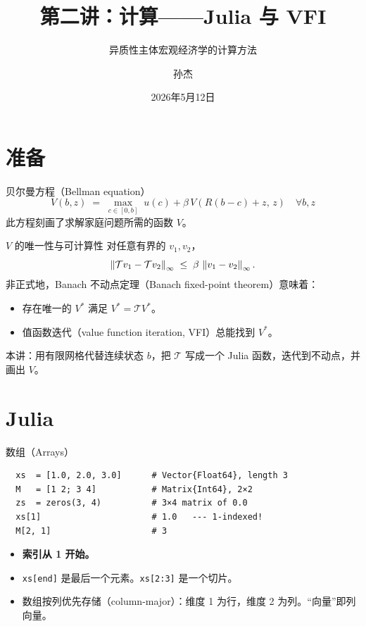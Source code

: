 \documentclass[10pt,aspectratio=169]{beamer}
\title{第二讲：计算——Julia 与 VFI}
\subtitle{异质性主体宏观经济学的计算方法}
\author{孙杰}
\institute{多伦多大学}
\date{2026年5月12日}
\begin{document}
\maketitle

\section{准备}

\begin{frame}{贝尔曼方程（Bellman equation）}
  \[
    \boxed{\;
      V(b, z) \;=\; \max_{c \in [0, b]} \; u(c)
        + \beta \, V(R(b-c) + z,\, z)\quad\forall b,z
    \;}
  \]
  此方程刻画了求解家庭问题所需的函数 $V$。
\end{frame}

\begin{frame}{$V$ 的唯一性与可计算性}
  对任意有界的 $v_1, v_2$，
  \[
    \left\| \mathcal{T} v_1 - \mathcal{T} v_2 \right\|_\infty
      \;\le\; \beta \, \left\| v_1 - v_2 \right\|_\infty.
  \]
  非正式地，Banach 不动点定理（Banach fixed-point theorem）意味着：
  \begin{itemize}
    \item 存在唯一的 $V^*$ 满足 $V^* = \mathcal{T} V^*$。
    \item 值函数迭代（value function iteration, VFI）总能找到 $V^*$。
  \end{itemize}
  本讲：用有限网格代替连续状态 $b$，把 $\mathcal{T}$ 写成一个 Julia 函数，迭代到不动点，并画出 $V$。
\end{frame}

\section{Julia}

\begin{frame}[fragile]{数组（Arrays）}
  \begin{lstlisting}
  xs  = [1.0, 2.0, 3.0]      # Vector{Float64}, length 3
  M   = [1 2; 3 4]           # Matrix{Int64}, 2×2
  zs  = zeros(3, 4)          # 3×4 matrix of 0.0
  xs[1]                      # 1.0   --- 1-indexed!
  M[2, 1]                    # 3
  \end{lstlisting}
  \begin{itemize}
    \item \textbf{索引从 1 开始。}
    \item \texttt{xs[end]} 是最后一个元素。\texttt{xs[2:3]} 是一个切片。
    \item 数组按列优先存储（column-major）：维度 1 为行，维度 2 为列。``向量''即列向量。
  \end{itemize}
\end{frame}
\end{document}
